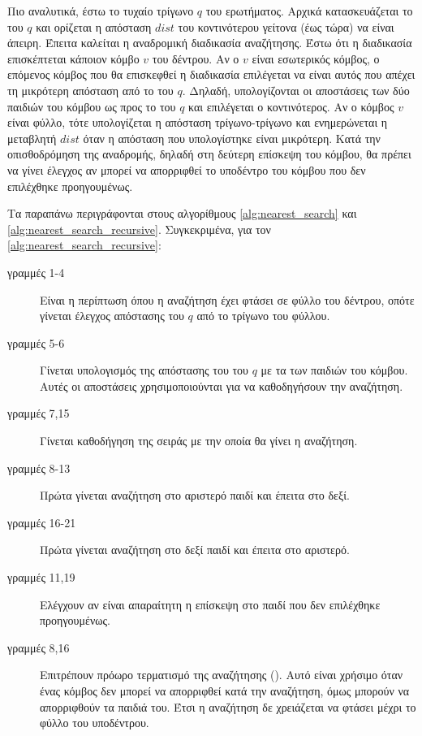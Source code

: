 Πιο αναλυτικά,
έστω το τυχαίο τρίγωνο $q$ του ερωτήματος.
Αρχικά κατασκευάζεται το  του $q$ και ορίζεται 
η απόσταση $dist$ του κοντινότερου γείτονα (έως τώρα) να είναι 
άπειρη. 
Έπειτα καλείται η αναδρομική διαδικασία αναζήτησης.
Έστω ότι η διαδικασία επισκέπτεται
κάποιον κόμβο $v$ του δέντρου. 
Αν ο $v$ είναι εσωτερικός κόμβος, ο επόμενος κόμβος 
που θα επισκεφθεί η διαδικασία επιλέγεται να είναι 
αυτός που απέχει τη μικρότερη απόσταση από το 
του $q$.
Δηλαδή, υπολογίζονται οι αποστάσεις  των 
δύο παιδιών του κόμβου ως προς το  του $q$ και 
επιλέγεται ο κοντινότερος.  
Αν ο κόμβος $v$ είναι φύλλο, τότε υπολογίζεται η απόσταση 
τρίγωνο-τρίγωνο και ενημερώνεται η μεταβλητή $dist$ όταν
η απόσταση που υπολογίστηκε είναι μικρότερη.
Κατά την οπισθοδρόμηση της αναδρομής, δηλαδή στη δεύτερη 
επίσκεψη του κόμβου, θα πρέπει να γίνει έλεγχος αν 
μπορεί να απορριφθεί το υποδέντρο του κόμβου που 
δεν επιλέχθηκε προηγουμένως.

Τα παραπάνω περιγράφονται στους αλγορίθμους \ref{alg:nearest_search}
και \ref{alg:nearest_search_recursive}. 
Συγκεκριμένα, για τον \ref{alg:nearest_search_recursive}:
\begin{description}
    \item[γραμμές 1-4] Είναι η περίπτωση όπου η αναζήτηση έχει 
    φτάσει σε φύλλο του δέντρου, οπότε γίνεται έλεγχος απόστασης 
    του $q$ από το τρίγωνο του φύλλου.
    \item[γραμμές 5-6] Γίνεται υπολογισμός της απόστασης του 
     του $q$ με τα  των παιδιών του κόμβου. 
    Αυτές οι αποστάσεις χρησιμοποιούνται για να καθοδηγήσουν 
    την αναζήτηση.
    \item[γραμμές 7,15] Γίνεται καθοδήγηση της σειράς με την 
    οποία θα γίνει η αναζήτηση.
    \item[γραμμές 8-13] Πρώτα γίνεται αναζήτηση στο αριστερό 
    παιδί και έπειτα στο δεξί.
    \item[γραμμές 16-21] Πρώτα γίνεται αναζήτηση στο δεξί 
    παιδί και έπειτα στο αριστερό.
    \item[γραμμές 11,19] Ελέγχουν αν είναι απαραίτητη 
    η επίσκεψη στο παιδί που δεν επιλέχθηκε προηγουμένως.
    \item[γραμμές 8,16] Επιτρέπουν πρόωρο τερματισμό της 
    αναζήτησης (). 
    Αυτό είναι χρήσιμο όταν ένας κόμβος δεν μπορεί να 
    απορριφθεί κατά την αναζήτηση, όμως μπορούν να 
    απορριφθούν τα παιδιά του.
    Έτσι η αναζήτηση δε χρειάζεται να φτάσει μέχρι 
    το φύλλο του υποδέντρου.
\end{description}

